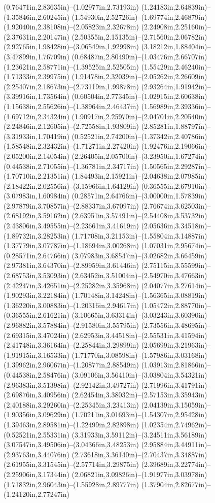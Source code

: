 (0.76471in,2.83635in)--(1.02977in,2.73193in) (1.24183in,2.64839in)--(1.35846in,2.60245in) (1.54930in,2.52726in)--(1.69774in,2.46879in) (1.92040in,2.38108in)--(2.05823in,2.32678in) (2.24908in,2.25160in)--(2.37631in,2.20147in) (2.50355in,2.15135in)--(2.71560in,2.06782in) (2.92765in,1.98428in)--(3.06549in,1.92998in) (3.18212in,1.88404in)--(3.47899in,1.76709in) (0.68487in,2.80490in)--(1.03476in,2.66707in) (1.23621in,2.58771in)--(1.39525in,2.52505in) (1.55429in,2.46240in)--(1.71333in,2.39975in) (1.91478in,2.32039in)--(2.05262in,2.26609in) (2.25407in,2.18673in)--(2.73119in,1.99878in) (2.93264in,1.91942in)--(3.39916in,1.73564in) (0.60504in,2.77345in)--(1.02915in,2.60638in) (1.15638in,2.55626in)--(1.38964in,2.46437in) (1.56989in,2.39336in)--(1.69712in,2.34324in) (1.90917in,2.25970in)--(2.04701in,2.20540in) (2.24846in,2.12605in)--(2.72558in,1.93809in) (2.85281in,1.88797in)--(3.31933in,1.70419in) (0.52521in,2.74200in)--(1.37342in,2.40786in) (1.58548in,2.32432in)--(1.71271in,2.27420in) (1.92476in,2.19066in)--(2.05200in,2.14054in) (2.26405in,2.05700in)--(3.23950in,1.67274in) (0.44538in,2.71055in)--(1.36781in,2.34717in) (1.50565in,2.29287in)--(1.70710in,2.21351in) (1.84493in,2.15921in)--(2.04638in,2.07985in) (2.18422in,2.02556in)--(3.15966in,1.64129in) (0.36555in,2.67910in)--(3.07983in,1.60984in) (0.28571in,2.64766in)--(3.00000in,1.57839in) (2.97879in,3.70857in)--(2.88337in,3.67097in) (2.76674in,3.62503in)--(2.68192in,3.59162in) (2.63951in,3.57491in)--(2.54408in,3.53732in) (2.43806in,3.49555in)--(2.23661in,3.41619in) (2.05636in,3.34518in)--(1.89732in,3.28253in) (1.71708in,3.21153in)--(1.55804in,3.14887in) (1.37779in,3.07787in)--(1.18694in,3.00268in) (1.07031in,2.95674in)--(0.28571in,2.64766in) (3.07983in,3.68547in)--(3.02682in,3.66459in) (2.97381in,3.64370in)--(2.89959in,3.61446in) (2.75115in,3.55599in)--(2.68753in,3.53093in) (2.63452in,3.51004in)--(2.54970in,3.47663in) (2.42247in,3.42651in)--(2.25282in,3.35968in) (2.04077in,3.27614in)--(1.90293in,3.22184in) (1.70148in,3.14248in)--(1.56365in,3.08819in) (1.36220in,3.00883in)--(1.20316in,2.94617in) (1.05472in,2.88770in)--(0.36555in,2.61621in) (3.10665in,3.63314in)--(3.03243in,3.60390in) (2.96882in,3.57884in)--(2.91580in,3.55795in) (2.73556in,3.48695in)--(2.69315in,3.47024in) (2.62953in,3.44518in)--(2.55531in,3.41594in) (2.41748in,3.36164in)--(2.25844in,3.29899in) (2.05699in,3.21963in)--(1.91915in,3.16533in) (1.71770in,3.08598in)--(1.57986in,3.03168in) (1.39962in,2.96067in)--(1.20877in,2.88549in) (1.03913in,2.81866in)--(0.44538in,2.58476in) (3.09106in,3.56410in)--(3.03804in,3.54321in) (2.96383in,3.51398in)--(2.92142in,3.49727in) (2.71996in,3.41791in)--(2.69876in,3.40956in) (2.62454in,3.38032in)--(2.57153in,3.35943in) (2.40188in,3.29260in)--(2.25345in,3.23413in) (2.04139in,3.15059in)--(1.90356in,3.09629in) (1.70211in,3.01693in)--(1.54307in,2.95428in) (1.39463in,2.89581in)--(1.22499in,2.82898in) (1.02354in,2.74962in)--(0.52521in,2.55331in) (3.31933in,3.59112in)--(3.24511in,3.56189in) (3.07547in,3.49506in)--(3.04366in,3.48253in) (2.95884in,3.44911in)--(2.93763in,3.44076in) (2.73618in,3.36140in)--(2.70437in,3.34887in) (2.61955in,3.31545in)--(2.57714in,3.29875in) (2.39689in,3.22774in)--(2.25906in,3.17344in) (2.06821in,3.09826in)--(1.91977in,3.03978in) (1.71832in,2.96043in)--(1.55928in,2.89777in) (1.37904in,2.82677in)--(1.24120in,2.77247in) 